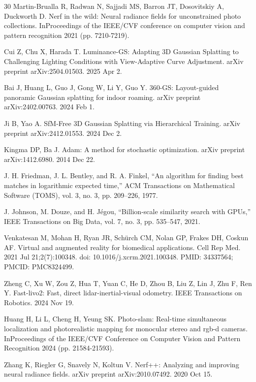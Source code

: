 \documentclass[11pt,a4paper]{article}
\begin{document}
\begin{thebibliography}{30}
Martin-Brualla R, Radwan N, Sajjadi MS, Barron JT, Dosovitskiy A, Duckworth D. Nerf in the wild: Neural radiance fields for unconstrained photo collections. InProceedings of the IEEE/CVF conference on computer vision and pattern recognition 2021 (pp. 7210-7219).

Cui Z, Chu X, Harada T. Luminance-GS: Adapting 3D Gaussian Splatting to Challenging Lighting Conditions with View-Adaptive Curve Adjustment. arXiv preprint arXiv:2504.01503. 2025 Apr 2.

Bai J, Huang L, Guo J, Gong W, Li Y, Guo Y. 360-GS: Layout-guided panoramic Gaussian splatting for indoor roaming. arXiv preprint arXiv:2402.00763. 2024 Feb 1.

Ji B, Yao A. SfM-Free 3D Gaussian Splatting via Hierarchical Training. arXiv preprint arXiv:2412.01553. 2024 Dec 2.

Kingma DP, Ba J. Adam: A method for stochastic optimization. arXiv preprint arXiv:1412.6980. 2014 Dec 22.

J. H. Friedman, J. L. Bentley, and R. A. Finkel, ``An algorithm for finding best matches in logarithmic expected time,'' ACM Transactions on Mathematical Software (TOMS), vol. 3, no. 3, pp. 209--226, 1977.

J. Johnson, M. Douze, and H. Jégou, ``Billion-scale similarity search with GPUs,'' IEEE Transactions on Big Data, vol. 7, no. 3, pp. 535--547, 2021.

Venkatesan M, Mohan H, Ryan JR, Schürch CM, Nolan GP, Frakes DH, Coskun AF. Virtual and augmented reality for biomedical applications. Cell Rep Med. 2021 Jul 21;2(7):100348. doi: 10.1016/j.xcrm.2021.100348. PMID: 34337564; PMCID: PMC8324499.

Zheng C, Xu W, Zou Z, Hua T, Yuan C, He D, Zhou B, Liu Z, Lin J, Zhu F, Ren Y. Fast-livo2: Fast, direct lidar-inertial-visual odometry. IEEE Transactions on Robotics. 2024 Nov 19.

Huang H, Li L, Cheng H, Yeung SK. Photo-slam: Real-time simultaneous localization and photorealistic mapping for monocular stereo and rgb-d cameras. InProceedings of the IEEE/CVF Conference on Computer Vision and Pattern Recognition 2024 (pp. 21584-21593).

Zhang K, Riegler G, Snavely N, Koltun V. Nerf++: Analyzing and improving neural radiance fields. arXiv preprint arXiv:2010.07492. 2020 Oct 15.


\end{thebibliography}
\end{document}
